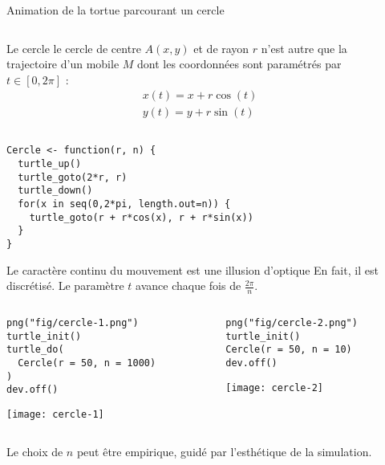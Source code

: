 \documentclass[10pt]{beamer}
\begin{document}
\begin{frame}[fragile]{Animation de la tortue parcourant un cercle}

\begin{columns}[c]
\begin{column}{0.58\textwidth}
  \begin{exampleblock}{Le cercle}
    le cercle de centre $A(x, y)$ et de rayon $r$ n'est autre que la trajectoire d'un mobile $M$ dont les
    coordonnées sont paramétrés par $t \in [0, 2\pi]$ :
\begin{align*}
x(t) = x + r \cos(t) \\
y(t) = y + r \sin(t)
\end{align*}
\end{exampleblock}
\end{column}
\begin{column}{0.38\textwidth}
\end{column}
\end{columns}

\begin{lstlisting}[style=editor]
Cercle <- function(r, n) {
  turtle_up()
  turtle_goto(2*r, r)
  turtle_down()
  for(x in seq(0,2*pi, length.out=n)) {
    turtle_goto(r + r*cos(x), r + r*sin(x))
  }
}
\end{lstlisting}

\end{frame}


\begin{frame}[fragile]{Le caractère continu du mouvement est une illusion d'optique}
 En fait, il est \alert{discrétisé}. Le paramètre $t$ avance chaque fois de $\frac{2\pi}{n}$.

\begin{columns}[b]
  \begin{column}{0.48\textwidth}
  \begin{lstlisting}[linerange=2-5]
png("fig/cercle-1.png")
turtle_init()
turtle_do(
  Cercle(r = 50, n = 1000)
)
dev.off()
\end{lstlisting}
\texttt{[image: cercle-1]}
\end{column}
\begin{column}{0.48\textwidth}

\begin{lstlisting}[linerange=2-3]
png("fig/cercle-2.png")
turtle_init()
Cercle(r = 50, n = 10)
dev.off()
\end{lstlisting}
\texttt{[image: cercle-2]}
\end{column}
\end{columns}

 Le choix de $n$ peut être empirique, guidé par l'esthétique de la simulation.
\end{frame}
\end{document}

